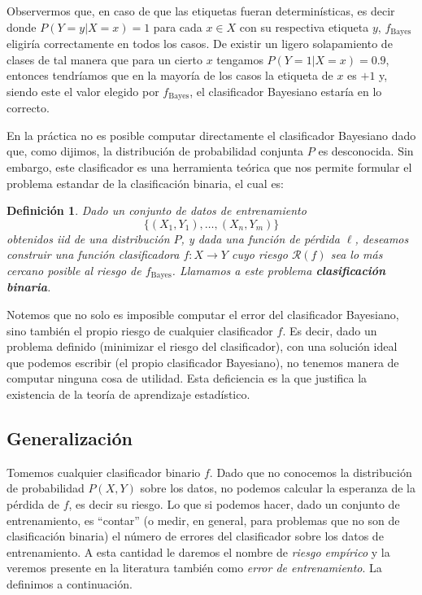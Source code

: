 \documentclass{report}
\newtheorem{dfn}{Definición}[section]
\begin{document}
Observermos que, en caso de que las etiquetas fueran determinísticas, es decir donde $P(Y=y|X=x)=1$ para cada $x\in X$ con su
respectiva etiqueta $y$, $f_{\text{Bayes}}$ eligiría correctamente en todos los casos. De existir un ligero solapamiento de clases
de tal manera que para un cierto $x$ tengamos $P(Y=1|X=x) = 0.9$, entonces tendríamos
que en la mayoría de los casos la etiqueta de $x$ es $+1$ y, siendo este el valor elegido por $f_{\text{Bayes}}$, el clasificador
Bayesiano estaría en lo correcto.

En la práctica no es posible computar directamente el clasificador Bayesiano dado que, como dijimos, la distribución de probabilidad
conjunta $P$ es desconocida. Sin embargo, este clasificador es una herramienta teórica que nos permite formular el problema
estandar de la clasificación binaria, el cual es:

\begin{dfn}
Dado un conjunto de datos de entrenamiento
$$ \{ (X_1,Y_1), \dots ,(X_n, Y_m)\}$$
obtenidos iid de una distribución $P$, y dada una función de pérdida $\ell$, deseamos construir una función clasificadora
$f:X\rightarrow Y$ cuyo riesgo $\mathcal{R}(f)$ sea lo más cercano posible al riesgo de $f_{\text{Bayes}}$. Llamamos a este problema
\textbf{clasificación binaria}.
\end{dfn}

Notemos que no solo es imposible computar el error del clasificador Bayesiano, sino también el propio riesgo de cualquier clasificador
$f$. Es decir, dado un problema definido (minimizar el riesgo del clasificador), con una solución ideal que podemos escribir (el propio
clasificador Bayesiano), no tenemos manera de computar ninguna cosa de utilidad. Esta deficiencia es la que justifica la existencia de
 la teoría de aprendizaje estadístico.


\subsection{Generalización}

Tomemos cualquier clasificador binario $f$. Dado que no conocemos la distribución de probabilidad $P(X,Y)$ sobre los datos, no podemos calcular
la esperanza de la pérdida de $f$, es decir su riesgo. Lo que si podemos hacer, dado un conjunto de entrenamiento, es ``contar'' (o medir, en general, para problemas
que no son de clasificación binaria) el número de errores del clasificador sobre los datos de entrenamiento. A esta cantidad le daremos
el nombre de \textit{riesgo empírico} y la veremos presente en la literatura también como \textit{error de entrenamiento}. La definimos a continuación.
\end{document}
